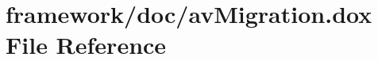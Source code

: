 \hypertarget{av_migration_8dox}{}\section{framework/doc/av\+Migration.dox File Reference}
\label{av_migration_8dox}
